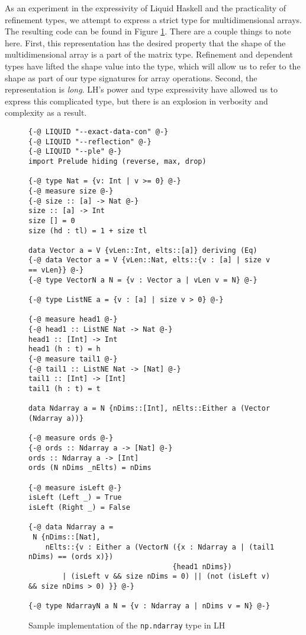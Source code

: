 \documentclass[12pt]{report}
\begin{document}
As an experiment in the expressivity of Liquid Haskell and the practicality of refinement types, we attempt to express a strict type for multidimensional arrays. The resulting code can be found in Figure \ref{lh-nparray}. There are a couple things to note here. First, this representation has the desired property that the shape of the multidimensional array is a part of the matrix type. Refinement and dependent types have lifted the shape value into the type, which will allow us to refer to the shape as part of our type signatures for array operations. Second, the representation is \textit{long}. LH's power and type expressivity have allowed us to express this complicated type, but there is an explosion in verbosity and complexity as a result.

\begin{figure}
    \centering
    {\small\begin{verbatim}
{-@ LIQUID "--exact-data-con" @-}
{-@ LIQUID "--reflection" @-}
{-@ LIQUID "--ple" @-}
import Prelude hiding (reverse, max, drop)

{-@ type Nat = {v: Int | v >= 0} @-}
{-@ measure size @-}
{-@ size :: [a] -> Nat @-}
size :: [a] -> Int
size [] = 0
size (hd : tl) = 1 + size tl

data Vector a = V {vLen::Int, elts::[a]} deriving (Eq)
{-@ data Vector a = V {vLen::Nat, elts::{v : [a] | size v == vLen}} @-}
{-@ type VectorN a N = {v : Vector a | vLen v = N} @-}

{-@ type ListNE a = {v : [a] | size v > 0} @-}

{-@ measure head1 @-}
{-@ head1 :: ListNE Nat -> Nat @-}
head1 :: [Int] -> Int
head1 (h : t) = h
{-@ measure tail1 @-}
{-@ tail1 :: ListNE Nat -> [Nat] @-}
tail1 :: [Int] -> [Int]
tail1 (h : t) = t

data Ndarray a = N {nDims::[Int], nElts::Either a (Vector (Ndarray a))}

{-@ measure ords @-}
{-@ ords :: Ndarray a -> [Nat] @-}
ords :: Ndarray a -> [Int]
ords (N nDims _nElts) = nDims

{-@ measure isLeft @-}
isLeft (Left _) = True
isLeft (Right _) = False

{-@ data Ndarray a =
 N {nDims::[Nat],
    nElts::{v : Either a (VectorN ({x : Ndarray a | (tail1 nDims) == (ords x)})
                                  {head1 nDims})
        | (isLeft v && size nDims = 0) || (not (isLeft v) && size nDims > 0) }} @-}

{-@ type NdarrayN a N = {v : Ndarray a | nDims v = N} @-}\end{verbatim}}
    \caption{Sample implementation of the \texttt{np.ndarray} type in LH}
    \label{lh-nparray}
\end{figure}
\end{document}
